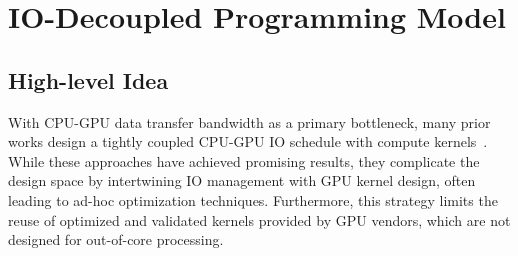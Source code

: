 
\begin{comment}
Because we only use SDMA engines for data forwarding to avoid occupying costly compute resources on the other GPUs, \texttt{Exchange} cannot move data at cache line granularity like zero-copy access.
The assumption taken by \texttt{Exchange} is that each \texttt{MemRef} in the source or destination \texttt{RefGroup} sizes a few hundred MBs, containing multiple packets.
Therefore, even if here we quadruple the bandwidth for a GPU by borrowing IO resources from neighbors, in some scenarios, like executing queries with low selectivity for certain columns, zero-copy access can outperform our \texttt{Exchange} operation.
More details are discussed in \S\ref{sec:ssb-selectivity} when we are dealing with query processing.
\end{comment}

\section{IO-Decoupled Programming Model}
\label{sec:IO-decoupled-model}

\subsection{\textbf{High-level Idea}}
With CPU-GPU data transfer bandwidth as a primary bottleneck, many prior works design a tightly coupled CPU-GPU IO schedule with compute kernels~\cite{triton-join, pump-up-volume, gowan-ipdpsw-2018, sioulas-icde-2019, rui-vldb2020}.
While these approaches have achieved promising results, they complicate the design space by intertwining IO management with GPU kernel design, often leading to ad-hoc optimization techniques. 
Furthermore, this strategy limits the reuse of optimized and validated kernels provided by GPU vendors, which are not designed for out-of-core processing.

